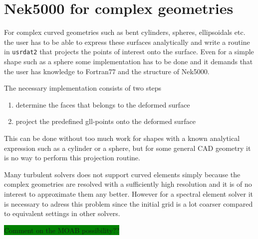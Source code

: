 \section{Nek5000 for complex geometries}
For complex curved geometries such as bent cylinders, spheres, ellipsoidals etc.
the user has to be able to express these surfaces analytically and write a routine
in \verb|usrdat2| that projects the points of interest onto the surface.
Even for a simple shape such as a sphere some implementation has to be done and it 
demands that the user has knowledge to Fortran77 and the structure of Nek5000.

The necessary implementation consists of two steps 
%
\begin{enumerate}
    \item determine the faces that belongs to the deformed surface
    \item project the predefined gll-points onto the deformed surface
\end{enumerate}
%
This can be done without too much work for shapes with a known analytical 
expression such as a cylinder or a sphere, but for some general CAD geometry 
it is no way to perform this projection routine. 

Many turbulent solvers does not support curved elements simply because the 
complex geometries are resolved with a sufficiently high resolution and it 
is of no interest to approximate them any better. However for a spectral element
solver it is necessary to adress this problem since the initial grid is a lot coarser
compared to equivalent settings in other solvers.

\colorbox{green}{Comment on the MOAB possibility??}

